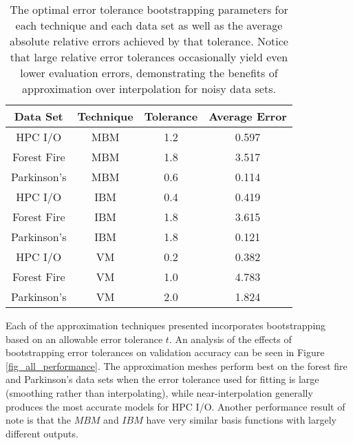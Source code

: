 \documentclass[sigconf]{acmart}
\begin{document}
\begin{table}
  \centering
  \begin{tabular}{c|c|c|c}
    \hline
    \textbf{Data Set} & \textbf{Technique} & \textbf{Tolerance} & \textbf{Average Error}\\
    \hline
    HPC I/O & MBM & 1.2 & 0.597\\
    Forest Fire & MBM & 1.8 & 3.517\\
    Parkinson's & MBM & 0.6 & 0.114\\
    \hline
    HPC I/O & IBM & 0.4 & 0.419\\
    Forest Fire & IBM & 1.8 & 3.615\\
    Parkinson's & IBM & 1.8 & 0.121\\
    \hline
    HPC I/O & VM & 0.2 & 0.382\\
    Forest Fire & VM & 1.0 & 4.783\\
    Parkinson's & VM & 2.0 & 1.824\\
    \hline
  \end{tabular}
  \caption{The optimal error tolerance bootstrapping parameters for each technique and each data set as well as the average absolute relative errors achieved by that tolerance. Notice that large relative error tolerances occasionally yield even lower evaluation errors, demonstrating the benefits of approximation over interpolation for noisy data sets.
  \vspace{-.5cm}}
  \label{tab_optimal_tolerance}
\end{table}

Each of the approximation techniques presented incorporates bootstrapping based on an allowable error tolerance $t$. An analysis of the effects of bootstrapping error tolerances on validation accuracy can be seen in Figure \ref{fig_all_performance}. The approximation meshes perform best on the forest fire and Parkinson's data sets when the error tolerance used for fitting is large (smoothing rather than interpolating), while near-interpolation generally produces the most accurate models for HPC I/O. Another performance result of note is that the $MBM$ and $IBM$ have very similar basis functions with largely different outputs.

\begin{figure*}
  \caption{The performance of all three techniques with varied relative error tolerance for the bootstrapping parameter. The columns are for Max Box Mesh, Iterative Box Mesh, and Voronoi Mesh, respectively. The rows are for HPC I/O, Forest Fire, and Parkinson's respectively. Notice the techniques' behavior on the Parkinson's and Forest Fire data sets, performance increases with larger error tolerance.}
  \label{fig_all_performance}
\end{figure*}
\end{document}
